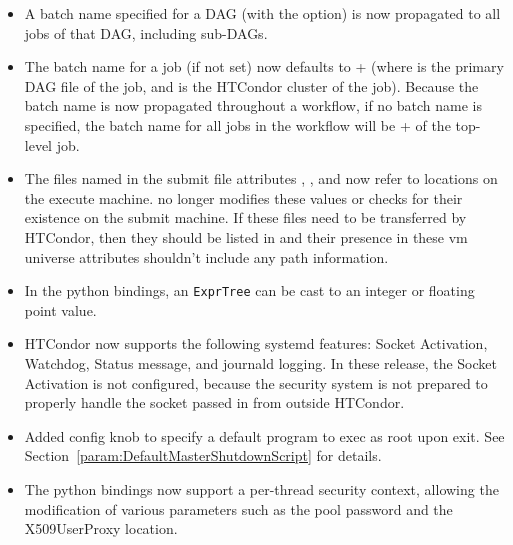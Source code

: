 \begin{itemize}
\item A batch name specified for a DAG (with the 
 option) is now propagated to all jobs of that DAG,
including sub-DAGs.

\item The batch name for a  job (if not set) now
defaults to + (where 
is the primary DAG file of the  job, and 
is the HTCondor cluster of the  job).
Because the batch name is now propagated throughout a workflow, if
no batch name is specified, the batch name for all jobs in the
workflow will be + of the top-level
 job.

\item The files named in the submit file attributes ,
, and  now refer to
locations on the execute machine.
 no longer modifies these values or checks for their
existence on the submit machine.
If these files need to be transferred by HTCondor, then they should be
listed in  and their presence in
these vm universe attributes shouldn't include any path information.

\item In the python bindings, an \texttt{ExprTree} can be cast to an integer
or floating point value.

\item HTCondor now supports the following systemd features: Socket Activation,
Watchdog, Status message, and journald logging. In these release, the
Socket Activation is not configured, because the security system is not
prepared to properly handle the socket passed in from outside HTCondor.

\item Added config knob  to
specify a default program to exec as root upon  exit.
See Section~\ref{param:DefaultMasterShutdownScript} for details.

\item The python bindings now support a per-thread security context,
allowing the modification of various parameters such as the pool password
and the X509UserProxy location.

\end{itemize}

